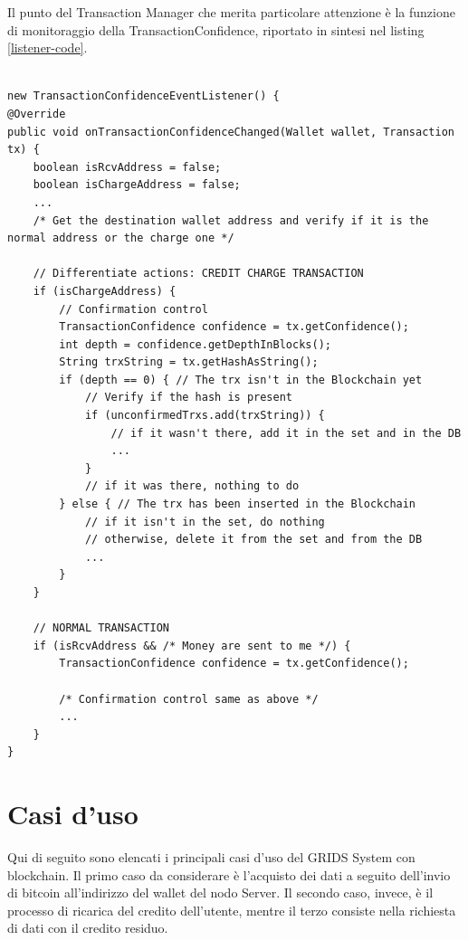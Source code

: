 Il punto del Transaction Manager che merita particolare attenzione è la funzione di monitoraggio della TransactionConfidence, riportato in sintesi nel listing \ref{listener-code}.

\begin{lstlisting}[caption={Transaction Confidence Event Listener},label={listener-code},style={c}]

new TransactionConfidenceEventListener() {
@Override
public void onTransactionConfidenceChanged(Wallet wallet, Transaction tx) {
    boolean isRcvAddress = false;
    boolean isChargeAddress = false;
    ...
    /* Get the destination wallet address and verify if it is the normal address or the charge one */
    
    // Differentiate actions: CREDIT CHARGE TRANSACTION
    if (isChargeAddress) {
        // Confirmation control
        TransactionConfidence confidence = tx.getConfidence();
        int depth = confidence.getDepthInBlocks();
        String trxString = tx.getHashAsString();
        if (depth == 0) { // The trx isn't in the Blockchain yet
            // Verify if the hash is present
            if (unconfirmedTrxs.add(trxString)) {
                // if it wasn't there, add it in the set and in the DB
                ...
            }
            // if it was there, nothing to do
        } else { // The trx has been inserted in the Blockchain
            // if it isn't in the set, do nothing
            // otherwise, delete it from the set and from the DB
            ...
        }
    }

    // NORMAL TRANSACTION
    if (isRcvAddress && /* Money are sent to me */) {
        TransactionConfidence confidence = tx.getConfidence();
        
        /* Confirmation control same as above */
        ...
    }
}

\end{lstlisting}


\section{Casi d'uso}
\label{c:integr:useCase}

Qui di seguito sono elencati i principali casi d'uso del GRIDS System con blockchain. Il primo caso da considerare è l'acquisto dei dati a seguito dell'invio di bitcoin all'indirizzo del wallet del nodo Server. Il secondo caso, invece, è il processo di ricarica del credito dell'utente, mentre il terzo consiste nella richiesta di dati con il credito residuo.

